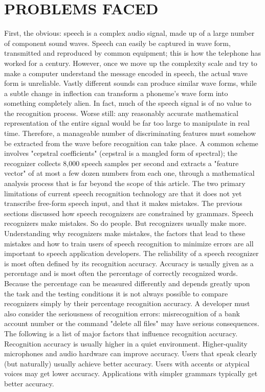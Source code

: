 \documentclass[11pt]{report} %
\begin{document}
\section{PROBLEMS FACED}
\label{sec:PROBLEMS FACED}
First, the obvious: speech is a complex audio signal, made up of a large number of
component sound waves. Speech can easily be captured in wave form, transmitted and
reproduced by common equipment; this is how the telephone has worked for a century.
However, once we move up the complexity scale and try to make a computer understand
the message encoded in speech, the actual wave form is unreliable. Vastly different
sounds can produce similar wave forms, while a subtle change in inflection can transform
a phoneme's wave form into something completely alien. In fact, much of the speech
signal is of no value to the recognition process. Worse still: any reasonably accurate
mathematical representation of the entire signal would be far too large to manipulate in
real time.
Therefore, a manageable number of discriminating features must somehow be extracted
from the wave before recognition can take place. A common scheme involves "cepstral
coefficients" (cepstral is a mangled form of spectral); the recognizer collects 8,000
speech samples per second and extracts a "feature vector" of at most a few dozen
numbers from each one, through a mathematical analysis process that is far beyond the
scope of this article.
The two primary limitations of current speech recognition technology are that it does not
yet transcribe free-form speech input, and that it makes mistakes. The previous sections
discussed how speech recognizers are constrained by grammars. Speech recognizers
make mistakes. So do people. But recognizers usually make more. Understanding why
recognizers make mistakes, the factors that lead to these mistakes and how to train users
of speech recognition to minimize errors are all important to speech application
developers.
The reliability of a speech recognizer is most often defined by its recognition accuracy.
Accuracy is usually given as a percentage and is most often the percentage of correctly
recognized words. Because the percentage can be measured differently and depends
greatly upon the task and the testing conditions it is not always possible to compare
recognizers simply by their percentage recognition accuracy. A developer must also
consider the seriousness of recognition errors: misrecognition of a bank account number
or the command "delete all files" may have serious consequences. The following is a list
of major factors that influence recognition accuracy.
Recognition accuracy is usually higher in a quiet environment.
Higher-quality microphones and audio hardware can improve accuracy.
Users that speak clearly (but naturally) usually achieve better accuracy.
Users with accents or atypical voices may get lower accuracy.
Applications with simpler grammars typically get better accuracy.
\end{document}
